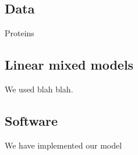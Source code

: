 \documentclass[12pt]{biorxiv}
\begin{document}
\begin{spacing}{2}
\subsection*{Data}

Proteins


\subsection*{Linear mixed models}

We used blah blah.


\subsection*{Software}
We have implemented our model 




%
%
%
%



%
%
%
%




\end{spacing}


%
%
%
%
\newpage


\end{document}
